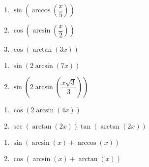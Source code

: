 \begin{multicols}{3}

\begin{enumerate}

\setcounter{enumi}{\value{HW}}

\item  $\sin\left(\arccos\left(\dfrac{x}{5}\right)\right)$
\item  $\cos\left(\arcsin\left(\dfrac{x}{2}\right)\right)$
\item  $\cos\left(\arctan\left(3x\right)\right)$ 

\setcounter{HW}{\value{enumi}}

\end{enumerate}

\end{multicols}

\begin{multicols}{2}

\begin{enumerate}

\setcounter{enumi}{\value{HW}}

\item  $\sin(2\arcsin(7x))$ 
\item  $\sin\left(2 \arcsin\left( \dfrac{x\sqrt{3}}{3} \right) \right)$

\setcounter{HW}{\value{enumi}}

\end{enumerate}

\end{multicols}

\begin{multicols}{2}

\begin{enumerate}

\setcounter{enumi}{\value{HW}}

\item  $\cos(2 \arcsin(4x))$
\item  $\sec(\arctan(2x))\tan(\arctan(2x))$

\setcounter{HW}{\value{enumi}}

\end{enumerate}

\end{multicols}

\begin{multicols}{2}

\begin{enumerate}

\setcounter{enumi}{\value{HW}}

\item $\sin \left( \arcsin(x) + \arccos(x) \right)$ 
\item $\cos \left( \arcsin(x) + \arctan(x) \right)$ 

\setcounter{HW}{\value{enumi}}

\end{enumerate}

\end{multicols}

